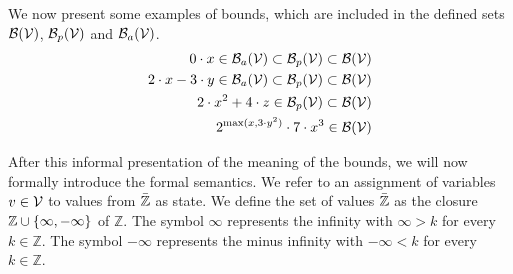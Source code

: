 We now present some examples of bounds, which are included in the defined sets $\mathcal{B}(\mathcal{V})$, $\mathcal{B}_p(\mathcal{V})$ and $\mathcal{B}_a(\mathcal{V})$.
\begin{align*}
  0 \cdot x \in \mathcal{B}_a(\mathcal{V}) \subset \mathcal{B}_p(\mathcal{V}) \subset \mathcal{B}(\mathcal{V}) \\
  2 \cdot x - 3 \cdot y \in \mathcal{B}_a(\mathcal{V}) \subset \mathcal{B}_p(\mathcal{V}) \subset \mathcal{B}(\mathcal{V}) \\
  2 \cdot x^2 + 4 \cdot z \in \mathcal{B}_p(\mathcal{V}) \subset \mathcal{B}(\mathcal{V}) \\
  2^{\max(x,3 \cdot y^2)} \cdot 7 \cdot x^3 \in \mathcal{B}(\mathcal{V})
\end{align*}

After this informal presentation of the meaning of the bounds, we will now formally introduce the formal semantics.
We refer to an assignment of variables $v \in \mathcal{V}$ to values from $\bar{\mathbb{Z}}$ as state.
We define the set of values $\bar{\mathbb{Z}}$ as the closure $\mathbb{Z} \cup \lbrace \infty, -\infty \rbrace$ of $\mathbb{Z}$.
The symbol $\infty$ represents the infinity with $\infty > k$ for every $k \in \mathbb{Z}$.
The symbol $-\infty$ represents the minus infinity with $-\infty < k$ for every $k \in \mathbb{Z}$.


